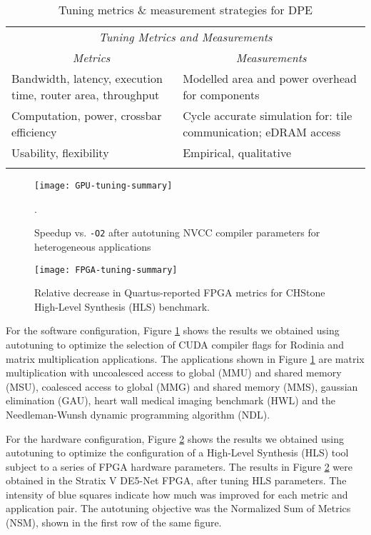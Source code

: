 \begin{table}[htpb]
\centering
\begin{tabular}{@{}p{}p{}@{}}
\toprule
\multicolumn{2}{c}{\textit{Tuning Metrics and Measurements}} \\
\multicolumn{1}{c}{\textit{Metrics}} & \multicolumn{1}{c}{\textit{Measurements}} \\ \midrule
Bandwidth, latency, execution time, router area, throughput & Modelled area and power overhead for components \\
\addlinespace
Computation, power, crossbar efficiency & Cycle accurate simulation for: tile communication; eDRAM access \\
\addlinespace
Usability, flexibility & Empirical, qualitative \\ \bottomrule
\addlinespace
\end{tabular}
\caption{Tuning metrics \& measurement strategies for DPE}
\label{tab:metrics-measurements}
\end{table}

\begin{figure}[htpb]
\centering
\texttt{[image: GPU-tuning-summary]}
\caption{Speedup vs. \texttt{-O2} after autotuning NVCC compiler parameters for heterogeneous
applications~\cite{bruel2017autotuning}}\label{fig:gpu-tuning-summary}.
\end{figure}

\begin{figure}[htpb]
\centering
\texttt{[image: FPGA-tuning-summary]}
\caption{Relative decrease in Quartus-reported FPGA metrics for CHStone
\cite{hara2008chstone} High-Level Synthesis (HLS)
benchmark.}\label{fig:fpga-tuning-summary}
\end{figure}

For the software configuration, Figure \ref{fig:gpu-tuning-summary} shows the
results \cite{bruel2017autotuning} we obtained using autotuning to optimize the
selection of CUDA compiler flags for Rodinia \cite{che2009rodinia} and matrix
multiplication applications. The applications shown in Figure
\ref{fig:gpu-tuning-summary} are matrix multiplication with uncoalesced access
to global (MMU) and shared memory (MSU), coalesced access to global (MMG) and
shared memory (MMS), gaussian elimination (GAU), heart wall medical imaging
benchmark (HWL) and the Needleman-Wunsh dynamic programming algorithm (NDL).

For the hardware configuration, Figure \ref{fig:fpga-tuning-summary} shows the
results we obtained using autotuning to optimize the configuration of a
High-Level Synthesis (HLS) tool \cite{canis2013legup} subject to a series of
FPGA hardware parameters. The results in Figure \ref{fig:fpga-tuning-summary}
were obtained in the Stratix V DE5-Net FPGA, after tuning HLS parameters. The
intensity of blue squares indicate how much was improved for each metric and
application pair. The autotuning objective was the Normalized Sum of Metrics
(NSM), shown in the first row of the same figure.

